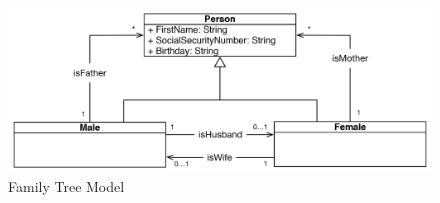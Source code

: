 \begin{figure}[H]
\centering
\includegraphics[width=\linewidth]{Abschnitte/Abbildungen/Grafiken/Family-Tree-Model}
\caption{Family Tree Model}
\label{fig:Family-Tree-Model}
\end{figure}
